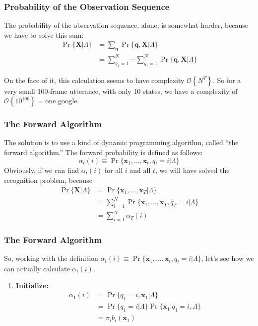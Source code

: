 \documentclass{beamer}
\begin{document}
\begin{frame}
  \frametitle{Probability of the Observation Sequence}

  The probability of the observation sequence, alone, is somewhat
  harder, because we have to solve this sum:
  \begin{align*}
    \Pr\{\mathbf{X}|\Lambda\} &= \sum_{\mathbf{q}} \Pr\{\mathbf{q},\mathbf{X}|\Lambda\}\\
    &= \sum_{q_T=1}^N\cdots\sum_{q_1=1}^N \Pr\{\mathbf{q},\mathbf{X}|\Lambda\}
  \end{align*}

  On the face of it, this calculation seems to have complexity
  ${\mathcal O}\left\{N^T\right\}$.  So for a very small 100-frame
  utterance, with only 10 states, we have a complexity of ${\mathcal
    O}\left\{10^{100}\right\}=$one google.
\end{frame}

\begin{frame}
  \frametitle{The Forward Algorithm}

  The solution is to use a kind of dynamic programming algorithm,
  called ``the forward algorithm.''  The forward probability is
  defined as follows:
  \[
  \alpha_t(i) \equiv \Pr\{\mathbf{x}_1,\ldots,\mathbf{x}_t,q_t=i|\Lambda\}
  \]
  Obviously, if we can find $\alpha_t(i)$ for all $i$ and all $t$, we
  will have solved the recognition problem, because
  \begin{align*}
    \Pr\{\mathbf{X}|\Lambda\} &= \Pr\{\mathbf{x}_1,\ldots,\mathbf{x}_T|\Lambda\}\\
    &= \sum_{i=1}^N \Pr\{\mathbf{x}_1,\ldots,\mathbf{x}_T,q_T=i|\Lambda\}\\
    &= \sum_{i=1}^N \alpha_T(i)
  \end{align*}
\end{frame}
  
\begin{frame}
  \frametitle{The Forward Algorithm}

  So, working with the definition $\alpha_t(i) \equiv
  \Pr\{\mathbf{x}_1,\ldots,\mathbf{x}_t,q_t=i|\Lambda\}$, let's see how we can
  actually calculate $\alpha_t(i)$.
  \begin{enumerate}
  \item {\bf Initialize:}
    \begin{align*}
      \alpha_1(i) &= \Pr\{q_1=i,\mathbf{x}_1|\Lambda\}\\
      &= \Pr\{q_1=i|\Lambda\}\Pr\{\mathbf{x}_1|q_1=i,\Lambda\}\\
      &= \pi_i b_i(\mathbf{x}_1)
    \end{align*}
  \end{enumerate}
\end{frame}
  
\end{document}
